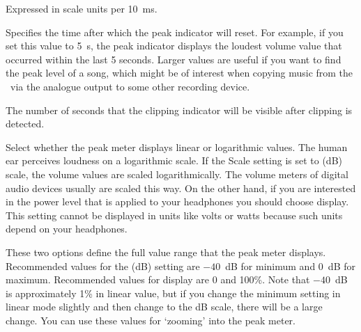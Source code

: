 \begin{description}
\begin{description}
      Expressed in scale units per 10~ms.
    \item[Peak Hold Time.]
      Specifies the time after which the peak indicator will reset.
      For example, if you set this value to 5~s, the peak indicator displays
      the loudest volume value that occurred within the last 5 seconds.
      Larger values are useful if you want to find the peak level of a song,
      which might be of interest when copying music from the \dap\ via the
      analogue output to some other recording device.
    \item[Clip Hold Time.]
      The number of seconds that the clipping indicator will be visible
      after clipping is detected.
    \item[Scale.]
      Select whether the peak meter displays linear or logarithmic values.
      The human ear perceives loudness on a logarithmic scale. If the Scale
      setting is set to  (dB) scale, the volume values
      are scaled logarithmically. The volume meters of digital audio
      devices usually are scaled this way. On the other hand, if you
      are interested in the power level that is applied to your headphones
      you should choose  display. This setting cannot be
      displayed in units like volts or watts because such units depend
      on your headphones.
    \item[Minimum and maximum range.]
      These two options define the full value range that the peak meter
      displays. Recommended values for the  (dB) setting
      are $-40$~dB for minimum and 0~dB for maximum. Recommended values
      for  display are 0 and 100\%. Note that $-40$~dB is
      approximately 1\% in linear value, but if you change the minimum
      setting in linear mode slightly and then change to the dB scale,
      there will be a large change. You can use these values for `zooming'
      into the peak meter.
    \end{description}


\end{description}
